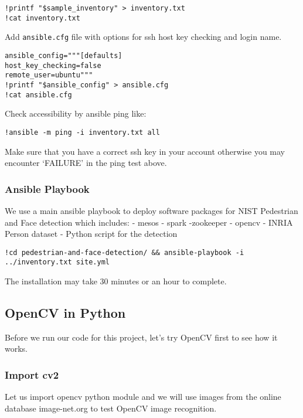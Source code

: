 \begin{lstlisting}
!printf "$sample_inventory" > inventory.txt
!cat inventory.txt
\end{lstlisting}

Add \texttt{ansible.cfg} file with options for ssh host key checking and
login name.

\begin{lstlisting}
ansible_config="""[defaults]
host_key_checking=false
remote_user=ubuntu"""
!printf "$ansible_config" > ansible.cfg
!cat ansible.cfg
\end{lstlisting}

Check accessibility by ansible ping like:

\begin{lstlisting}
!ansible -m ping -i inventory.txt all
\end{lstlisting}

Make sure that you have a correct ssh key in your account otherwise you
may encounter `FAILURE' in the ping test above.

\subsubsection{Ansible Playbook}\label{ansible-playbook}

We use a main ansible playbook to deploy software packages for NIST
Pedestrian and Face detection which includes: - mesos - spark -zookeeper
- opencv - INRIA Person dataset - Python script for the detection

\begin{lstlisting}
!cd pedestrian-and-face-detection/ && ansible-playbook -i ../inventory.txt site.yml
\end{lstlisting}

The installation may take 30 minutes or an hour to complete.

\subsection{OpenCV in Python}\label{opencv-in-python}

Before we run our code for this project, let's try OpenCV first to see
how it works.

\subsubsection{Import cv2}\label{import-cv2}

Let us import opencv python module and we will use images from the online
database image-net.org to test OpenCV image recognition.

